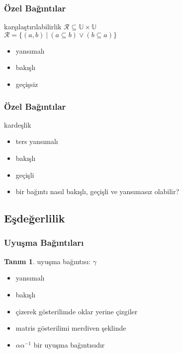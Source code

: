 \documentclass[dvipsnames]{beamer}
\theoremstyle{definition}
\newtheorem{tanim}[theorem]{Tanım}
\theoremstyle{example}
\theoremstyle{plain}
\begin{document}
\begin{frame}
  \frametitle{Özel Bağıntılar}

  \begin{block}{karşılaştırılabilirlik}
    $\mathcal{R} \subseteq \mathbb{U} \times \mathbb{U}$\\
    $\mathcal{R} = \{(a,b)~|~(a \subseteq b) \vee (b \subseteq a)\}$

    \medskip
    \begin{itemize}
      \item yansımalı
      \item bakışlı
      \item geçişsiz
    \end{itemize}
  \end{block}
\end{frame}

\begin{frame}
  \frametitle{Özel Bağıntılar}

  \begin{block}{kardeşlik}
    \begin{itemize}
      \item ters yansımalı
      \item bakışlı
      \item geçişli
    \end{itemize}

    \pause
    \medskip
    \begin{itemize}
      \item bir bağıntı nasıl bakışlı, geçişli ve yansımasız olabilir?
    \end{itemize}
  \end{block}
\end{frame}

\subsection{Eşdeğerlilik}

\begin{frame}
  \frametitle{Uyuşma Bağıntıları}

  \begin{tanim}
    \alert{uyuşma bağıntısı}: $\gamma$
    \begin{itemize}
      \item yansımalı
      \item bakışlı
    \end{itemize}
  \end{tanim}

  \pause
  \begin{itemize}
    \item çizerek gösterilimde oklar yerine çizgiler
    \item matris gösterilimi merdiven şeklinde
  \end{itemize}

  \pause
  \begin{itemize}
    \item $\alpha \alpha^{-1}$ bir uyuşma bağıntısıdır
  \end{itemize}
\end{frame}
\end{document}
